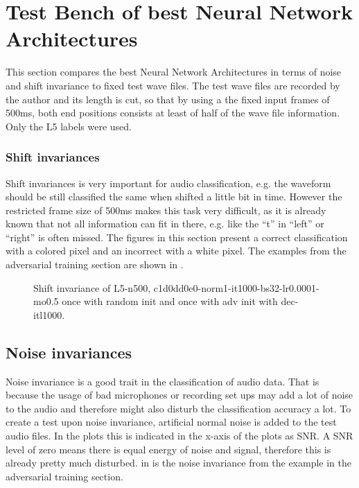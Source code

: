 
\section{Test Bench of best Neural Network Architectures}\label{sec:exp_tb}
This section compares the best Neural Network Architectures in terms of noise and shift invariance to fixed test wave files.
The test wave files are recorded by the author and its length is cut, so that by using a the fixed input frames of 500ms, both end positions consists at least of half of the wave file information.
Only the L5 labels were used.

\subsubsection{Shift invariances}
Shift invariances is very important for audio classification, e.g. the waveform should be still classified the same when shifted a little bit in time.
However the restricted frame size of 500ms makes this task very difficult, as it is already known that not all information can fit in there, e.g. like the \enquote{t} in \enquote{left} or \enquote{right} is often missed.
The figures in this section present a correct classification with a colored pixel and an incorrect with a white pixel.
The examples from the adversarial training section are shown in .
\begin{figure}[!ht]
  \centering
  \caption{Shift invariance of L5-n500, c1d0dd0e0-norm1-it1000-bs32-lr0.0001-mo0.5 once with random init and once with adv init with dec-itl1000.}
  \label{fig:exp_tb_shift_fc3}
\end{figure}
\FloatBarrier
\noindent


\subsection{Noise invariances}
Noise invariance is a good trait in the classification of audio data.
That is because the usage of bad microphones or recording set ups may add a lot of noise to the audio and therefore might also disturb the classification accuracy a lot.
To create a test upon noise invariance, artificial normal noise is added to the test audio files.
In the plots this is indicated in the x-axis of the plots as SNR. 
A SNR level of zero means there is equal energy of noise and signal, therefore this is already pretty much disturbed.
in  is the noise invariance from the example in the adversarial training section.

